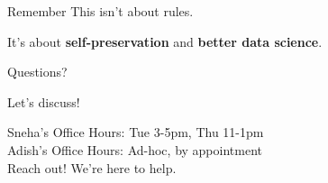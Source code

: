 \documentclass{beamer}
\begin{document}
\begin{frame}{Remember}
\Large
This isn't about rules.

\vspace{1em}
\normalsize
It's about \textbf{self-preservation} and \textbf{better data science}.

\end{frame}

\begin{frame}{Questions?}
\begin{center}
\Large
Let's discuss!

\vspace{2em}
\normalsize
Sneha's Office Hours: Tue 3-5pm, Thu 11-1pm \\
Adish's Office Hours: Ad-hoc, by appointment \\
Reach out! We're here to help.
\end{center}
\end{frame}
\end{document}
